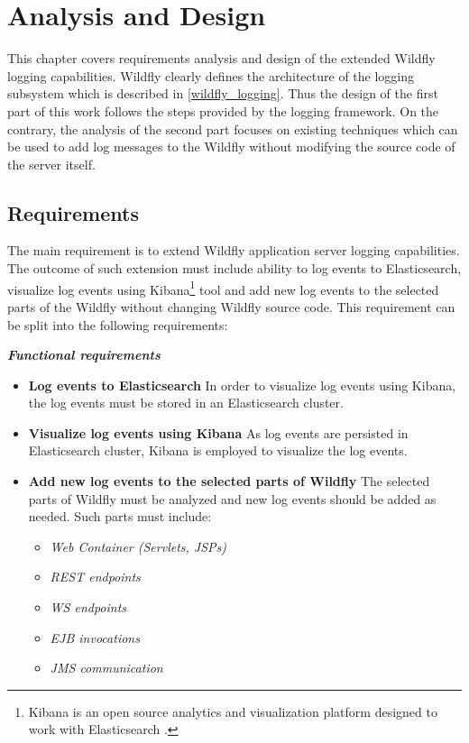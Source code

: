 \documentclass[12pt,oneside]{fithesis2}
\begin{document}
\chapter{Analysis and Design}
This chapter covers requirements analysis and design of the extended Wildfly logging capabilities. Wildfly clearly defines the architecture of the logging subsystem which is described in \ref{wildfly_logging}. Thus the design of the first part of this work follows the steps provided by the logging framework. On the contrary, the analysis of the second part focuses on existing techniques which can be used to add log messages to the Wildfly without modifying the source code of the server itself.

\section{Requirements}
The main requirement is to extend Wildfly application server logging capabilities. The outcome of such extension must include ability to log events to Elasticsearch, visualize log events using Kibana\footnote{Kibana is an open source analytics and visualization platform designed to work with Elasticsearch \cite{kibana_doc}.} tool and add new log events to the selected parts of the Wildfly without changing Wildfly source code. This requirement can be split into the following requirements:

\noindent
\newline
\textit{\textbf{Functional requirements}}
\begin{itemize}
	\item \textbf{Log events to Elasticsearch} \newline
	In order to visualize log events using Kibana, the log events must be stored in an Elasticsearch cluster.
	\item \textbf{Visualize log events using Kibana} \newline
	As log events are persisted in Elasticsearch cluster, Kibana is employed to visualize the log events.
	\item \textbf{Add new log events to the selected parts of Wildfly}  \newline
	The selected parts of Wildfly must be analyzed and new log events should be added as needed. Such parts must include:
	 \begin{itemize}
	 	\item \textit{Web Container (Servlets, JSPs)}
	 	\item \textit{REST endpoints}
	 	\item \textit{WS endpoints}
	 	\item \textit{EJB invocations}
	 	\item \textit{JMS communication}
	 \end{itemize}
\end{itemize}
\end{document}
